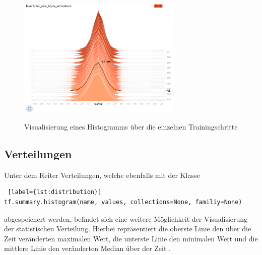 \vspace{0.6cm}
\begin{figure}[h!]
	\centering
	 \includegraphics[width=0.7\textwidth]{images/Kapitel_3/histogram.png}\\
	\vspace{10pt} 
	\caption[Visualisierung eines Histogramms über die einzelnen Trainingsschritte]{Visualisierung eines Histogramms über die einzelnen Trainingschritte}
	\label{fig:histogram}
\end{figure}






\subsection{Verteilungen}
\vspace{10pt}

Unter dem Reiter Verteilungen, welche ebenfalls mit der Klasse
\\

\begin{minipage}{\linewidth}
\begin{lstlisting} [label={lst:distribution}]
tf.summary.histogram(name, values, collections=None, familiy=None)
\end{lstlisting}
\end{minipage}
\vspace{0.2cm}

abgespeichert werden, befindet sich eine weitere Möglichkeit der Visualisierung der statistischen Verteilung. Hierbei repräsentiert die oberste Linie den über die Zeit veränderten maximalen Wert, die unterste Linie den minimalen Wert und die mittlere Linie den veränderten Median über der Zeit \cite{tensorboard.2017}.

